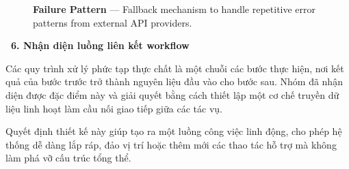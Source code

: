 \documentclass[12pt, a4paper]{article}
\begin{document}
\begin{figure}[H]
    \centering
    \caption{\textbf{Failure Pattern} --- Fallback mechanism to handle repetitive error patterns from external API providers.}
\end{figure}

\vspace{0.4cm}
\noindent\textcolor{brown!80!black}{\textbf{\faProjectDiagram \ 6. Nhận diện luồng liên kết workflow}}
\vspace{0.15cm}

\begin{tcolorbox}[blanker, borderline west={3pt}{0pt}{brown!60!black}, left=12pt, top=2pt, bottom=2pt]
Các quy trình xử lý phức tạp thực chất là một chuỗi các bước thực hiện, nơi kết quả của bước trước trở thành nguyên liệu đầu vào cho bước sau. Nhóm đã nhận diện được đặc điểm này và giải quyết bằng cách thiết lập một cơ chế truyền dữ liệu linh hoạt làm cầu nối giao tiếp giữa các tác vụ.

\vspace{0.15cm}
\noindent Quyết định thiết kế này giúp tạo ra một luồng công việc linh động, cho phép hệ thống dễ dàng lắp ráp, đảo vị trí hoặc thêm mới các thao tác hỗ trợ mà không làm phá vỡ cấu trúc tổng thể.
\end{tcolorbox}
\end{document}
